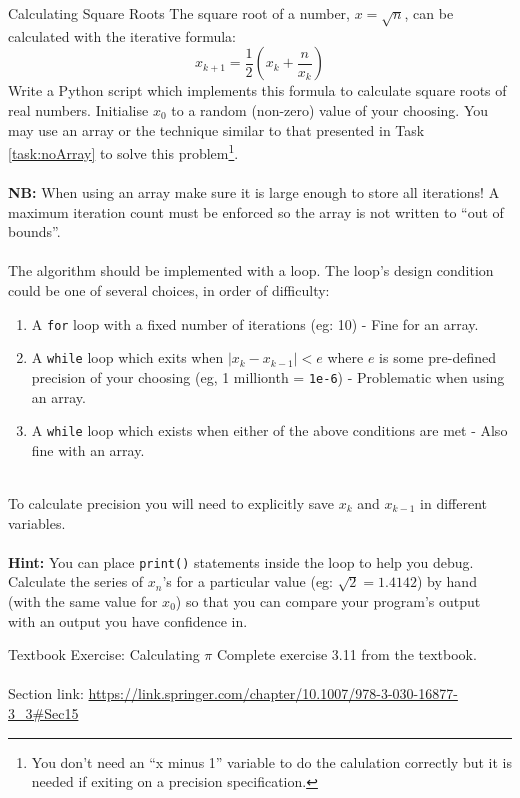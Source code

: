 \documentclass{lab}
\begin{document}
\pagebreak
\begin{task}{Calculating Square Roots}{}
The square root of a number, $x = \sqrt{n}$, can be calculated with the iterative formula:
\begin{equation}\label{eq:sqrt}
x_{k+1} = \frac{1}{2}\left(x_k + \frac{n}{x_k}\right)
\end{equation}
Write a Python script which implements this formula to calculate square roots of real numbers. Initialise $x_0$ to a random (non-zero) value of your choosing. You may use an array or the technique similar to that presented in Task \ref{task:noArray} to solve this problem\footnote{You don't need an ``x minus 1'' variable to do the calulation correctly but it is needed if exiting on a precision specification.}.
\\ \\
\textbf{NB:} When using an array make sure it is large enough to store all iterations! A maximum iteration count must be enforced so the array is not written to ``out of bounds''.
\\ \\
The algorithm should be implemented with a loop. The loop's design condition could be one of several choices, in order of difficulty:\\
\begin{enumerate}
\item A \texttt{for} loop with a fixed number of iterations (eg: 10) - Fine for an array.
\item A \texttt{while} loop which exits when $\left| x_k - x_{k-1} \right| < e$ where $e$ is some pre-defined precision of your choosing (eg, 1 millionth = \texttt{1e-6}) - Problematic when using an array.
\item A \texttt{while} loop which exists when either of the above conditions are met - Also fine with an array.
\end{enumerate}
~\\
To calculate precision you will need to explicitly save $x_k$ and $x_{k-1}$ in different variables.
\\~\\
\textbf{Hint:} You can place \texttt{print()} statements inside the loop to help you debug. Calculate the series of $x_n$'s for a particular value (eg: $\sqrt{2}=1.4142$) by hand (with the same value for $x_0$) so that you can compare your program's output with an output you have confidence in.
\end{task}\label{tsk:sqrt}

\begin{task}{Textbook Exercise: Calculating $\pi$}{}
Complete exercise 3.11 from the textbook.
\\~\\
Section link: \url{https://link.springer.com/chapter/10.1007/978-3-030-16877-3_3#Sec15}
\end{task}
\end{document}
